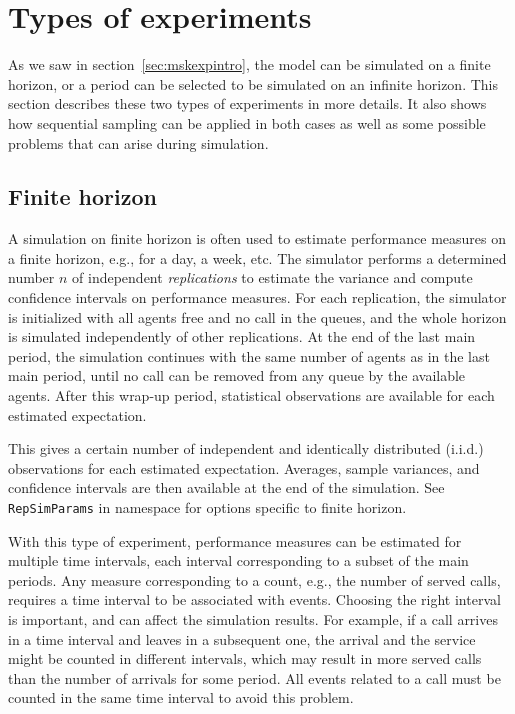 \section{Types of experiments}
\label{sec:mskexp}

As we saw in section~\ref{sec:mskexpintro},
the model can be simulated on a finite horizon, or
a period can be selected to be simulated on an infinite horizon.
This section describes these two types of experiments in more details.
It also shows how sequential sampling can be applied in both cases as well
as some possible problems that can arise during simulation.

\subsection{Finite horizon}
\label{sec:expfinite}

A simulation on finite horizon is often used to estimate performance
measures on a finite horizon, e.g., for a day, a week, etc.
The simulator performs a determined
number $n$ of independent \emph{replications}
to estimate the variance and compute confidence intervals on
performance measures.  For each replication,
the simulator is
initialized with all agents free and
no call in the queues, and the whole horizon is simulated
independently of other replications. At the end of the last main
period,
the simulation continues with the same number of agents as in the last
main period, until no call can be removed from any queue by the
available agents.
After this wrap-up period,
statistical
observations are available for each estimated expectation.

This gives a certain number of independent and identically distributed
(i.i.d.) observations for each estimated
expectation.  Averages, sample variances, and
confidence intervals are then available at the end of the simulation.
See \texttt{RepSimParams} in namespace
for options specific to finite horizon.

With this type of experiment, performance measures can be estimated
for multiple time intervals, each interval corresponding to a subset
of the main periods.
Any measure corresponding to a count, e.g., the number of served
calls, requires a time interval to be associated with events.
Choosing the right interval is important, and can affect the simulation
results.
For example,
if a call arrives in a time interval and leaves in a
subsequent one, the arrival and the service might be counted in
different intervals, which may result in more served calls than the
number of arrivals for some period.
All events related to a call
must be counted in the same time interval to avoid
this problem.


